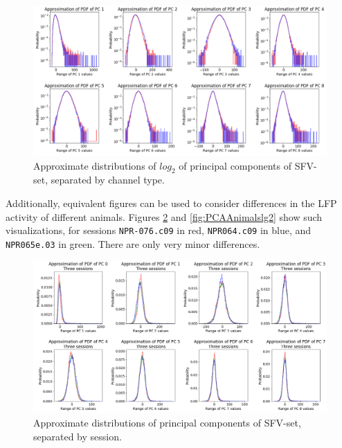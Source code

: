 \documentclass{kththesis}
\begin{document}
\begin{figure}[H]
    \centering
    \centerline{\includegraphics[width=1.2\textwidth]{images/PCA/PCABOTHLG2.png}}
    \caption{Approximate distributions of \begin{math}log_2\end{math} of principal components of SFV-set, separated by channel type.}
    \label{fig:PCAPDFBOTHLG2}
\end{figure}

Additionally, equivalent figures can be used to consider differences in the LFP activity of different animals.
Figures \ref{fig:PCAAnimals} and \ref{fig:PCAAnimalslg2} show such visualizations, for sessions \texttt{NPR-076.c09} in red, \texttt{NPR064.c09} in blue, and \texttt{NPR065e.03} in green.
There are only very minor differences.

\begin{figure}[H]
    \centering
    \centerline{\includegraphics[width=1.2\textwidth]{images/PCA/PCAAnimalsnormal.png}}
    \caption{Approximate distributions of principal components of SFV-set, separated by session.}
    \label{fig:PCAAnimals}
\end{figure}
\end{document}
